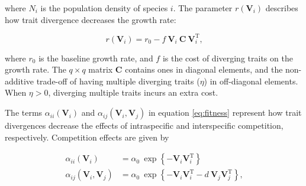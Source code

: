 \noindent where $N_i$ is the population density of  species $i$.
The parameter $r(\mathbf{V}_i)$ describes how trait divergence decreases the growth rate:

\begin{equation} \label{eq:growth-rate}
    r(\mathbf{V}_i) = r_0 - f ~ \mathbf{V}_i ~ \mathbf{C} ~ \mathbf{V}_{i}^{\textrm{T}}
    \textrm{,}
\end{equation}

\noindent where $r_0$ is the baseline growth rate, and
$f$ is the cost of diverging traits on the growth rate.
The $q \times q$ matrix $\mathbf{C}$ contains ones in diagonal elements, and the
non-additive trade-off of having multiple diverging traits ($\eta$) in off-diagonal
elements.
When $\eta > 0$, diverging multiple traits incurs an extra cost.


%
%


The terms $\alpha_{ii}(\mathbf{V}_i)$ and $\alpha_{ij}(\mathbf{V}_i, \mathbf{V}_j)$
in equation \ref{eq:fitness} represent how trait divergences decrease the effects
of intraspecific and interspecific competition, respectively.
Competition effects are given by

\begin{equation} \label{eq:competition}
\begin{split}
    \alpha_{ii}(\mathbf{V}_i) &= \alpha_0 ~\exp \left\{- \mathbf{V}_i
        \mathbf{V}_i^{\textrm{T}} \right\} \\
    \alpha_{ij}(\mathbf{V}_i, \mathbf{V}_j) &= \alpha_0 ~\exp \left\{
        - \mathbf{V}_i \mathbf{V}_i^{\textrm{T}} -
        d ~ \mathbf{V}_j \mathbf{V}_j^{\textrm{T}} \right\}
	\textrm{,}
\end{split}
\end{equation}

